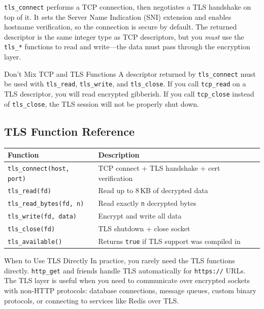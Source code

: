 \lstinline|tls_connect| performs a TCP connection, then negotiates a TLS
handshake on top of it. It sets the Server Name Indication (SNI) extension
and enables hostname verification, so the connection is secure by default.
The returned descriptor is the same integer type as TCP descriptors, but you
\emph{must} use the \lstinline|tls_*| functions to read and write---the data
must pass through the encryption layer.

\begin{warnbox}{Don't Mix TCP and TLS Functions}
A descriptor returned by \lstinline|tls_connect| must be used with
\lstinline|tls_read|, \lstinline|tls_write|, and \lstinline|tls_close|. If
you call \lstinline|tcp_read| on a TLS descriptor, you will read encrypted
gibberish. If you call \lstinline|tcp_close| instead of
\lstinline|tls_close|, the TLS session will not be properly shut down.
\end{warnbox}

\subsection{TLS Function Reference}\label{sec:tls-reference}

\begin{center}
\begin{tabular}{lp{8cm}}
\toprule
\textbf{Function} & \textbf{Description} \\
\midrule
\lstinline|tls_connect(host, port)| & TCP connect + TLS handshake + cert verification \\
\lstinline|tls_read(fd)| & Read up to 8\,KB of decrypted data \\
\lstinline|tls_read_bytes(fd, n)| & Read exactly \texttt{n} decrypted bytes \\
\lstinline|tls_write(fd, data)| & Encrypt and write all data \\
\lstinline|tls_close(fd)| & TLS shutdown + close socket \\
\lstinline|tls_available()| & Returns \lstinline|true| if TLS support was compiled in \\
\bottomrule
\end{tabular}
\end{center}

\begin{defnbox}{When to Use TLS Directly}
In practice, you rarely need the TLS functions directly. \lstinline|http_get|
and friends handle TLS automatically for \lstinline|https://| URLs. The TLS
layer is useful when you need to communicate over encrypted sockets with
non-HTTP protocols: database connections, message queues, custom binary
protocols, or connecting to services like Redis over TLS.
\end{defnbox}

